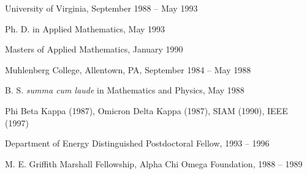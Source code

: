 \itemskip
{}
\begin{description}
\item
University of Virginia, September 1988 -- May 1993
\begin{description}
\item
Ph. D. in Applied Mathematics, May 1993
\item
Masters of Applied Mathematics, January 1990
\end{description}
\item
Muhlenberg College, Allentown, PA, September 1984 -- May 1988
\begin{description}
\item
B. S. {\it summa cum laude} in Mathematics and Physics, May 1988
\end{description}
\end{description}

\itemskip
{}
\begin{description}
\item
Phi Beta Kappa (1987), Omicron Delta Kappa (1987), SIAM (1990), IEEE (1997)
\end{description}

\itemskip
{}
\begin{description}
\item
Department of Energy Distinguished Postdoctoral Fellow, 1993 -- 1996
\item
M. E. Griffith Marshall Fellowship, Alpha Chi Omega Foundation, 1988 -- 1989
\end{description}
 

